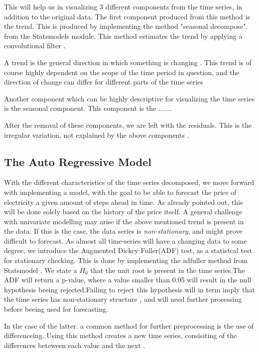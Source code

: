 \documentclass
[twocolumn,
secnumarabic,
nobibnotes,
aps,
prl,
reprint,
groupedaddress,
amsmath,
amssymb,
]{revtex4-2}
\begin{document}
This will help us in visualizing 3 different components from the time series, in addition to the original data. The first component produced from this method is the trend. This is produced by implementing the method "seasonal decompose". from the Statsmodels module. This method estimates the trend by applying a convolutional filter \cite{seabold2010statsmodels}. 

A trend is the general direction in which something is changing \cite{Auffarth2021}. This trend is of course highly dependent on the scope of the time period in question, and the direction of change can differ for different parts of the time series \cite{Vishwas2020}  


Another component which can be highly descriptive for visualizing the time series is the seasonal component. This component is the .......


After the removal of these components, we are left with the residuals. This is the irregular variation, not explained by the above components \cite{Vishwas2020}.

\subsection{The Auto Regressive Model}
With the different characteristics of the time series decomposed, we move forward with implementing a model, with the goal to be able to forecast the price of electricity a given amount of steps ahead in time. As already pointed out, this will be done solely based on the history of the price itself. A general challenge with univariate modelling may arise if the above mentioned trend is present in the data. If this is the case, the data series is \emph{non-stationary}, and might prove difficult to forecast. As almost all time-series will have a changing data to some degree, we introduce the Augmented Dickey Fuller(ADF) test, as a statistcal test for stationary checking. This is done by implementing the adfuller method from Statsmodel \cite{seabold2010statsmodels}. We state a $H_0$ that the unit root is present in the time series.The ADF will return a p-value, where a value smaller than 0.05 will result in the null hypothesis beeing rejected.Failing to reject this hypothesis will in term imply that the time series has non-stationary structure \cite{Vishwas2020}, and will need further processing before beeing used for forecasting.  

In the case of the latter. a common method for further preprocessing is the use of differenceing. Using this method creates a new time series, consisiting of the differences beteween each value and the next \cite{Korstanje2021}.
\end{document}
